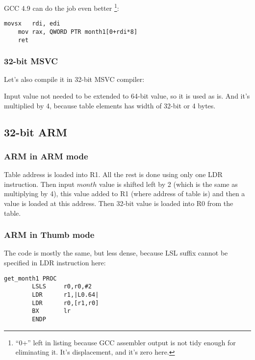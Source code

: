 \Optimizing GCC 4.9 can do the job even better
\footnote{``0+'' left in listing because GCC assembler output is not tidy enough for eliminating it. 
It's displacement, and it's zero here.}:

\begin{lstlisting}[caption=\Optimizing GCC 4.9 x64]
	movsx	rdi, edi
	mov	rax, QWORD PTR month1[0+rdi*8]
	ret
\end{lstlisting}

\subsubsection{32-bit MSVC}

Let's also compile it in 32-bit MSVC compiler:



Input value not needed to be extended to 64-bit value, so it is used as is.
And it's multiplied by 4, because table elements has width of 32-bit or 4 bytes.

\subsection{32-bit ARM}

\subsubsection{ARM in ARM mode}



Table address is loaded into R1.
All the rest is done using only one LDR instruction.
Then input $month$ value is shifted left by 2 (which is the same as multiplying by 4), this value added
to R1 (where address of table is) and then a value is loaded at this address.
Then 32-bit value is loaded into R0 from the table.

\subsubsection{ARM in Thumb mode}

The code is mostly the same, but less dense, because LSL suffix cannot be specified in LDR instruction here:

\begin{lstlisting}
get_month1 PROC
        LSLS     r0,r0,#2
        LDR      r1,|L0.64|
        LDR      r0,[r1,r0]
        BX       lr
        ENDP
\end{lstlisting}

